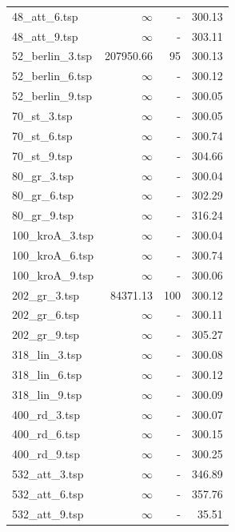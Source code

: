 \begin{table}[H]
\begin{tabular}{|l|r|r|r|}
48\_att\_6.tsp & $\infty$ & - & 300.13 \\
48\_att\_9.tsp & $\infty$ & - & 303.11 \\
52\_berlin\_3.tsp & 207950.66 & 95 & 300.13 \\
52\_berlin\_6.tsp & $\infty$ & - & 300.12 \\
52\_berlin\_9.tsp & $\infty$ & - & 300.05 \\
70\_st\_3.tsp & $\infty$ & - & 300.05 \\
70\_st\_6.tsp & $\infty$ & - & 300.74 \\
70\_st\_9.tsp & $\infty$ & - & 304.66 \\
80\_gr\_3.tsp & $\infty$ & - & 300.04 \\
80\_gr\_6.tsp & $\infty$ & - & 302.29 \\
80\_gr\_9.tsp & $\infty$ & - & 316.24 \\
100\_kroA\_3.tsp & $\infty$ & - & 300.04 \\
100\_kroA\_6.tsp & $\infty$ & - & 300.74 \\
100\_kroA\_9.tsp & $\infty$ & - & 300.06 \\
202\_gr\_3.tsp & 84371.13 & 100 & 300.12 \\
202\_gr\_6.tsp & $\infty$ & - & 300.11 \\
202\_gr\_9.tsp & $\infty$ & - & 305.27 \\
318\_lin\_3.tsp & $\infty$ & - & 300.08 \\
318\_lin\_6.tsp & $\infty$ & - & 300.12 \\
318\_lin\_9.tsp & $\infty$ & - & 300.09 \\
400\_rd\_3.tsp & $\infty$ & - & 300.07 \\
400\_rd\_6.tsp & $\infty$ & - & 300.15 \\
400\_rd\_9.tsp & $\infty$ & - & 300.25 \\
532\_att\_3.tsp & $\infty$ & - & 346.89 \\
532\_att\_6.tsp & $\infty$ & - & 357.76 \\
532\_att\_9.tsp & $\infty$ & - & 35.51 \\
\hline
\end{tabular}
\end{table}

